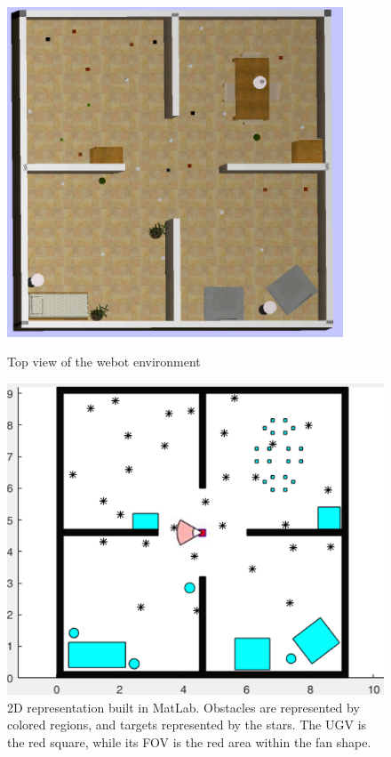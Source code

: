 \documentclass[12pt,draftcls,onecolumn]{IEEEtran}
\begin{document}
\begin{figure}[p]
\centering
\includegraphics[width=10cm]{figures/webotTop}
  \caption{Top view of the webot environment}
  \label{fig:1}
\includegraphics[width=13cm]{figures/newWorld}
  \caption{2D representation built in MatLab. Obstacles are represented by colored regions, and targets represented by the stars. The UGV is  the red square, while its FOV is the red area within the fan shape.}
  \label{fig:2}
\end{figure}



\clearpage


\end{document}
